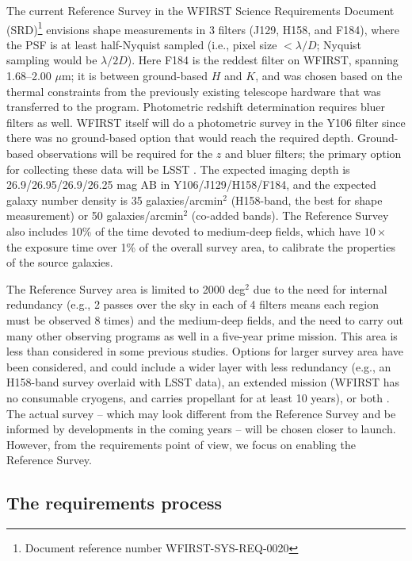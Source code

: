 \documentclass[usenatbib]{mnras}
\begin{document}
The current Reference Survey in the WFIRST Science Requirements Document (SRD)\footnote{Document reference number WFIRST-SYS-REQ-0020} envisions shape measurements in 3 filters (J129, H158, and F184), where the PSF is at least half-Nyquist sampled (i.e., pixel size $<\lambda/D$; Nyquist sampling would be $\lambda/2D$). Here F184 is the reddest filter on WFIRST, spanning 1.68--2.00 $\mu$m; it is between ground-based $H$ and $K$, and was chosen based on the thermal constraints from the previously existing telescope hardware that was transferred to the program. Photometric redshift determination requires bluer filters as well. WFIRST itself will do a photometric survey in the Y106 filter since there was no ground-based option that would reach the required depth. Ground-based observations will be required for the $z$ and bluer filters; the primary option for collecting these data will be LSST \citep{2009arXiv0912.0201L,2019ApJ...873..111I}.  The expected imaging depth is 26.9/26.95/26.9/26.25 mag AB in Y106/J129/H158/F184, and the expected galaxy number density is 35 galaxies/arcmin$^2$ (H158-band, the best for shape measurement) or 50 galaxies/arcmin$^2$ (co-added bands). The Reference Survey also includes 10\% of the time devoted to medium-deep fields, which have $10\times$ the exposure time over 1\% of the overall survey area, to calibrate the properties of the source galaxies. %

The Reference Survey area is limited to 2000 deg$^2$ due to the need for internal redundancy (e.g., 2 passes over the sky in each of 4 filters means each region must be observed 8 times) and the medium-deep fields, and the need to carry out many other observing programs as well in a five-year prime mission. This area is less than considered in some previous studies. Options for larger survey area have been considered, and could include a wider layer with less redundancy (e.g., an H158-band survey overlaid with LSST data), an extended mission (WFIRST has no consumable cryogens, and carries propellant for at least 10 years), or both \citep{2019BAAS...51c.418E}. The actual survey -- which may look different from the Reference Survey and be informed by developments in the coming years -- will be chosen closer to launch. However, from the requirements point of view, we focus on enabling the Reference Survey.

\subsection{The requirements process}
\label{ss:req}
\end{document}
